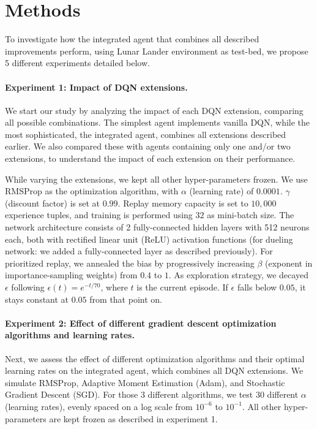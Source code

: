 \documentclass{article}
\begin{document}
    \section{Methods}
    \label{sec:methods}
    To investigate how the integrated agent that combines all described improvements perform, using Lunar Lander environment as test-bed, we propose 5 different experiments detailed below.

    \paragraph{Experiment 1: Impact of DQN extensions.}
    We start our study by analyzing the impact of each DQN extension, comparing all possible combinations.
    The simplest agent implements vanilla DQN, while the most sophisticated, the integrated agent, combines all extensions described earlier.
    We also compared these with agents containing only one and/or two extensions, to understand the impact of each extension on their performance.

    While varying the extensions, we kept all other hyper-parameters frozen.
    We use RMSProp as the optimization algorithm, with $\alpha$ (learning rate) of $0.0001$.
    $\gamma$ (discount factor) is set at $0.99$.
    Replay memory capacity is set to $10,000$ experience tuples, and training is performed using $32$ as mini-batch size.
    The network architecture consists of 2 fully-connected hidden layers with 512 neurons each, both with rectified linear unit (ReLU) activation functions (for dueling network: we added a fully-connected layer as described previously).
    For prioritized replay, we annealed the bias by progressively increasing $\beta$ (exponent in importance-sampling weights) from $0.4$ to $1$.
    As exploration strategy, we decayed $\epsilon$ following $\epsilon(t) = e^{-t/70}$, where $t$ is the current episode.
    If $\epsilon$ falls below $0.05$, it stays constant at $0.05$ from that point on.

    \paragraph{Experiment 2: Effect of different gradient descent optimization algorithms and learning rates.}
    Next, we assess the effect of different optimization algorithms and their optimal learning rates on the integrated agent, which combines all DQN extensions.
    We simulate RMSProp, Adaptive Moment Estimation (Adam), and Stochastic Gradient Descent (SGD).
    For those 3 different algorithms, we test $30$ different $\alpha$ (learning rates), evenly spaced on a log scale from $10^{-6}$ to $10^{-1}$.
    All other hyper-parameters are kept frozen as described in experiment 1.
\end{document}
